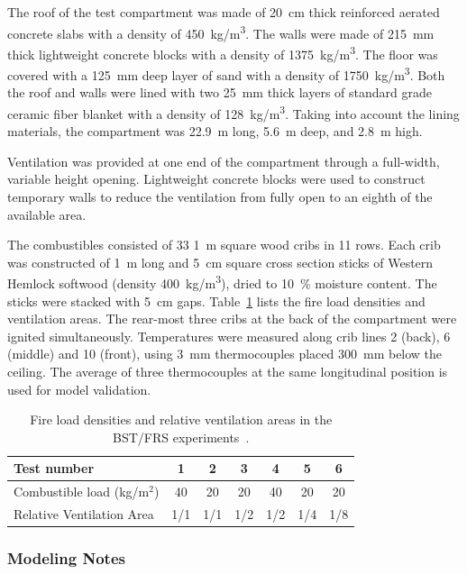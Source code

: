 The roof of the test compartment was made of 20~cm thick reinforced aerated concrete slabs with a density of 450~\unit{kg/m^3}. The walls were made of 215~mm thick lightweight concrete blocks with a density of 1375~\unit{kg/m^3}. The floor was covered with a 125~mm deep layer of sand with a density of 1750~\unit{kg/m^3}. Both the roof and walls were lined with two 25~mm thick layers of standard grade ceramic fiber blanket with a density of 128~\unit{kg/m^3}. Taking into account the lining materials, the compartment was 22.9~m long, 5.6~m deep, and 2.8~m high.

Ventilation was provided at one end of the compartment through a full-width, variable height opening. Lightweight concrete blocks were used to construct temporary walls to reduce the ventilation from fully open to an eighth of the available area.

The combustibles consisted of 33 1~m square wood cribs in 11 rows. Each crib was constructed of 1~m long and 5~cm square cross section sticks of Western Hemlock softwood (density 400~\unit{kg/m^3}), dried to 10~\% moisture content. The sticks were stacked with 5~cm gaps. Table~\ref{BST_FRS_wood_cribs_tests} lists the fire load densities and ventilation areas. The rear-most three cribs at the back of the compartment were ignited simultaneously. Temperatures were measured along crib lines 2 (back), 6 (middle) and 10 (front), using 3~mm thermocouples placed 300~mm below the ceiling. The average of three thermocouples at the same longitudinal position is used for model validation.

\begin{table}[ht]
\centering
\caption[BST/FRS test cases]{Fire load densities and relative ventilation areas in the BST/FRS experiments~\cite{BST_FRS:1994}.}
\label{BST_FRS_wood_cribs_tests}
\begin{tabular}{|l|c|c|c|c|c|c|}
\hline
Test number                     & 1   & 2   & 3   & 4   & 5  & 6  \\ \hline \hline
Combustible load (kg/m$^2$)     & 40  & 20  & 20  & 40  & 20 & 20 \\
Relative Ventilation Area       & 1/1 & 1/1 & 1/2 & 1/2 & 1/4 & 1/8 \\ \hline
\end{tabular}
\end{table}

\subsubsection{Modeling Notes}

